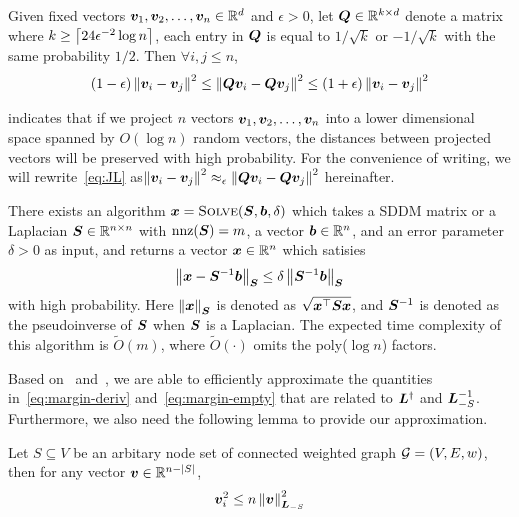 \documentclass[sigconf]{acmart}
\begin{document}
\begin{lemma}\label{lem:JL}
    Given fixed vectors \(\boldsymbol{v}_1,\boldsymbol{v}_2,\dots,\boldsymbol{v}_n\in\mathbb{R}^d\) and \(\epsilon>0\), let \(\boldsymbol{Q}\in\mathbb{R}^{k\times d}\) denote a matrix where \(k\ge\left\lceil24\epsilon^{-2}\log n\right\rceil\), each entry in \(\boldsymbol{Q}\) is equal to \(1/\sqrt k\) or \(-1/\sqrt k\) with the same probability \(1/2\). Then \(\forall i,j\le n\),
    \begin{equation}\label{eq:JL}
        (1-\epsilon)\left\Vert\boldsymbol{v}_i-\boldsymbol{v}_j\right\Vert^2\le\left\Vert\boldsymbol{Q}\boldsymbol{v}_i-\boldsymbol{Q}\boldsymbol{v}_j\right\Vert^2\le(1+\epsilon)\left\Vert\boldsymbol{v}_i-\boldsymbol{v}_j\right\Vert^2
    \end{equation}
\end{lemma}
 indicates that if we project \(n\) vectors \(\boldsymbol{v}_1,\boldsymbol{v}_2,\dots,\boldsymbol{v}_n\) into a lower dimensional space spanned by \(O(\log n)\) random vectors, the distances between projected vectors will be preserved with high probability.
For the convenience of writing, we will rewrite~\eqref{eq:JL} as\(\left\Vert\boldsymbol{v}_i-\boldsymbol{v}_j\right\Vert^2\approx_\epsilon\left\Vert\boldsymbol{Q}\boldsymbol{v}_i-\boldsymbol{Q}\boldsymbol{v}_j\right\Vert^2\) hereinafter.

\begin{lemma}\label{lem:solver}
    There exists an algorithm \(\boldsymbol{x}=\textsc{Solve}(\boldsymbol{S},\boldsymbol{b},\delta)\) which takes a SDDM matrix or a Laplacian \(\boldsymbol{S}\in\mathbb{R}^{n\times n}\) with \(\text{nnz}(\boldsymbol{S})=m\), a vector \(\boldsymbol{b}\in\mathbb{R}^n\), and an error parameter \(\delta>0\) as input, and returns a vector \(\boldsymbol{x}\in\mathbb{R}^n\) which satisies
    \[\left\Vert\boldsymbol{x}-\boldsymbol{S}^{-1}\boldsymbol{b}\right\Vert_{\boldsymbol{S}}\le\delta\left\Vert\boldsymbol{S}^{-1}\boldsymbol{b}\right\Vert_{\boldsymbol{S}}\]
    with high probability.
    Here \(\left\Vert\boldsymbol{x}\right\Vert_{\boldsymbol{S}}\) is denoted as \(\sqrt{\boldsymbol{x}^\top\boldsymbol{S}\boldsymbol{x}}\), and \(\boldsymbol{S}^{-1}\) is denoted as the pseudoinverse of \(\boldsymbol{S}\) when \(\boldsymbol{S}\) is a Laplacian.
    The expected time complexity of this algorithm is \(\tilde{O}(m)\), where \(\tilde{O}(\cdot)\) omits the poly(\(\log n\)) factors.

\end{lemma}

Based on~ and~, we are able to efficiently approximate the quantities in~\eqref{eq:margin-deriv} and~\eqref{eq:margin-empty} that are related to \(\boldsymbol{L}^\dagger\) and \(\boldsymbol{L}_{-S}^{-1}\).
Furthermore, we also need the following lemma to provide our approximation.

\begin{lemma}\label{lem:norm-comp}
    Let \(S\subseteq V\) be an arbitary node set of connected weighted graph \(\mathcal{G}=(V,E,w)\), then for any vector \(\boldsymbol{v}\in\mathbb{R}^{n-\left|S \right|}\),
    \[\boldsymbol{v}_i^2\le n\left\Vert\boldsymbol{v}\right\Vert_{\boldsymbol{L}_{-S}}^2\]
\end{lemma}
\end{document}
